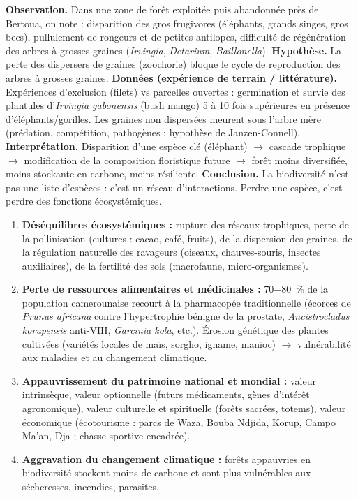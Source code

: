 \documentclass[11pt]{article}
\newcounter{popsec}
\newcounter{popsub}
\newcommand{\courssub}[1]{%
  \stepcounter{popsub}%
  \par\vspace{9pt}\noindent{\popxbold\fontsize{11.5}{13}\selectfont\color{popink}{\color{poporange}\thepopsec.\thepopsub}\hspace{6pt}#1}\par\nopagebreak\vspace{4pt}
}
\begin{document}
\courssub{Conséquences de la perte de biodiversité}

\begin{experience}
\textbf{Observation.} Dans une zone de forêt exploitée puis abandonnée près de Bertoua, on note : disparition des gros frugivores (éléphants, grands singes, gros becs), pullulement de rongeurs et de petites antilopes, difficulté de régénération des arbres à grosses graines (\emph{Irvingia}, \emph{Detarium}, \emph{Baillonella}).
\textbf{Hypothèse.} La perte des dispersers de graines (zoochorie) bloque le cycle de reproduction des arbres à grosses graines.
\textbf{Données (expérience de terrain / littérature).} Expériences d'exclusion (filets) vs parcelles ouvertes : germination et survie des plantules d'\emph{Irvingia gabonensis} (bush mango) 5 à 10 fois supérieures en présence d'éléphants/gorilles. Les graines non dispersées meurent sous l'arbre mère (prédation, compétition, pathogènes : hypothèse de Janzen-Connell).
\textbf{Interprétation.} Disparition d'une espèce clé (éléphant) $\rightarrow$ cascade trophique $\rightarrow$ modification de la composition floristique future $\rightarrow$ forêt moins diversifiée, moins stockante en carbone, moins résiliente.
\textbf{Conclusion.} La biodiversité n'est pas une liste d'espèces : c'est un réseau d'interactions. Perdre une espèce, c'est perdre des fonctions écosystémiques.
\end{experience}

\begin{propriete}
\begin{enumerate}
    \item \textbf{Déséquilibres écosystémiques :} rupture des réseaux trophiques, perte de la pollinisation (cultures : cacao, café, fruits), de la dispersion des graines, de la régulation naturelle des ravageurs (oiseaux, chauves-souris, insectes auxiliaires), de la fertilité des sols (macrofaune, micro-organismes).
    \item \textbf{Perte de ressources alimentaires et médicinales :} \SI{70-80}{\%} de la population camerounaise recourt à la pharmacopée traditionnelle (écorces de \emph{Prunus africana} contre l'hypertrophie bénigne de la prostate, \emph{Ancistrocladus korupensis} anti-VIH, \emph{Garcinia kola}, etc.). Érosion génétique des plantes cultivées (variétés locales de maïs, sorgho, igname, manioc) $\rightarrow$ vulnérabilité aux maladies et au changement climatique.
    \item \textbf{Appauvrissement du patrimoine national et mondial :} valeur intrinsèque, valeur optionnelle (futurs médicaments, gènes d'intérêt agronomique), valeur culturelle et spirituelle (forêts sacrées, totems), valeur économique (écotourisme : parcs de Waza, Bouba Ndjida, Korup, Campo Ma'an, Dja ; chasse sportive encadrée).
    \item \textbf{Aggravation du changement climatique :} forêts appauvries en biodiversité stockent moins de carbone et sont plus vulnérables aux sécheresses, incendies, parasites.
\end{enumerate}
\end{propriete}
\end{document}
